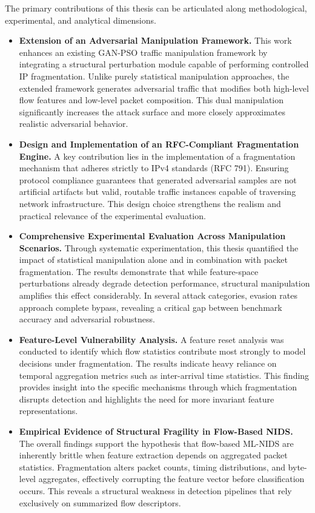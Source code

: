 The primary contributions of this thesis can be articulated along methodological, experimental, and analytical dimensions.

\begin{itemize}

\item \textbf{Extension of an Adversarial Manipulation Framework.}  
This work enhances an existing GAN-PSO traffic manipulation framework by integrating a structural perturbation module capable of performing controlled IP fragmentation. Unlike purely statistical manipulation approaches, the extended framework generates adversarial traffic that modifies both high-level flow features and low-level packet composition. This dual manipulation significantly increases the attack surface and more closely approximates realistic adversarial behavior.

\item \textbf{Design and Implementation of an RFC-Compliant Fragmentation Engine.}  
A key contribution lies in the implementation of a fragmentation mechanism that adheres strictly to IPv4 standards (RFC 791). Ensuring protocol compliance guarantees that generated adversarial samples are not artificial artifacts but valid, routable traffic instances capable of traversing network infrastructure. This design choice strengthens the realism and practical relevance of the experimental evaluation.

\item \textbf{Comprehensive Experimental Evaluation Across Manipulation Scenarios.}  
Through systematic experimentation, this thesis quantified the impact of statistical manipulation alone and in combination with packet fragmentation. The results demonstrate that while feature-space perturbations already degrade detection performance, structural manipulation amplifies this effect considerably. In several attack categories, evasion rates approach complete bypass, revealing a critical gap between benchmark accuracy and adversarial robustness.

\item \textbf{Feature-Level Vulnerability Analysis.}  
A feature reset analysis was conducted to identify which flow statistics contribute most strongly to model decisions under fragmentation. The results indicate heavy reliance on temporal aggregation metrics such as inter-arrival time statistics. This finding provides insight into the specific mechanisms through which fragmentation disrupts detection and highlights the need for more invariant feature representations.

\item \textbf{Empirical Evidence of Structural Fragility in Flow-Based NIDS.}  
The overall findings support the hypothesis that flow-based ML-NIDS are inherently brittle when feature extraction depends on aggregated packet statistics. Fragmentation alters packet counts, timing distributions, and byte-level aggregates, effectively corrupting the feature vector before classification occurs. This reveals a structural weakness in detection pipelines that rely exclusively on summarized flow descriptors.

\end{itemize}

